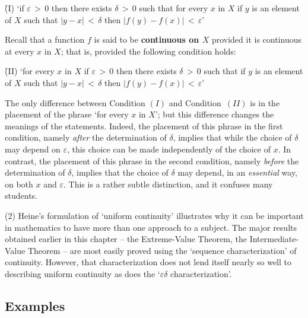 {\VHalf

        \h (I) `if ${\varepsilon}\,>\,0$ then there exists ${\delta}\,>\,0$ such that for every $x$ in $X$ if $y$ is an element of $X$ such that $|y-x|\,<\,{\delta}$
    then $|f(y)-f(x)|\,<\,{\varepsilon}$'

\VHalf


     Recall that a function $f$ is said to be {\bf continuous on $X$} provided it is continuous at every $x$ in $X$; that is, provided the following condition holds:

\VHalf

        \h (II) `for every $x$ in $X$ if ${\varepsilon}\,>\,0$ then there exists ${\delta}\,>\,0$ such that if $y$ is an element of $X$ such that
    $|y-x|\,<\,{\delta}$ then $|f(y)-f(x)|\,<\,{\varepsilon}$'

\VHalf


\noindent The only difference between Condition $(I)$ and  Condition~$(II)$ is in the placement of the phrase `for every $x$ in $X$'; but this difference changes the meanings of the statements.
    Indeed, the placement of this phrase in the first condition, namely {\em after} the determination of ${\delta}$,
    implies that while the choice of ${\delta}$ may depend on ${\varepsilon}$, this choice can be made independently of the choice of $x$.
    In contrast, the placement of this phrase in the second condition, namely {\em before} the determination of ${\delta}$,
    implies that the choice of ${\delta}$ may depend, in an {\em essential} way, on both $x$ and ${\varepsilon}$.
    This is a rather subtle distinction, and it confuses many students.

\V

        (2) Heine's formulation of `uniform continuity' illustrates why it can be important in mathematics to have more than one approach to a subject.
    The major results obtained earlier in this chapter -- the Extreme-Value Theorem, the Intermediate-Value Theorem -- are most easily proved using the `sequence characterization' of continuity.
    However, that characterization does not lend itself nearly so well to describing uniform continuity as does the `${\varepsilon}{\delta}$ characterization'.


             \subsection{\small{\bf Examples}}
            \label{ExampD60.30}

\V

}
